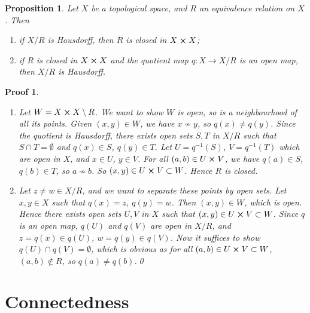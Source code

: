 \documentclass{article}
\theoremstyle{plain}\theoremheaderfont{\normalfont\itshape}\theorembodyfont{\rmfamily}\theoremseparator{.}\newtheorem*{rem}{Remark}\newtheorem*{ex}{Example}\newtheorem*{proof}{Proof}\newtheorem*{altp}{Alternative proof}
\theoremstyle{plain}\theoremheaderfont{\normalfont\bfseries}\theorembodyfont{\rmfamily}\theoremseparator{.}\newtheorem{thm}{Theorem}[section]\newtheorem{lem}[thm]{Lemma}\newtheorem{prop}[thm]{Proposition}\newtheorem*{cor}{Corollary}\newtheorem{defn}[thm]{Definition}\newtheorem{clm}[thm]{Claim}\newtheorem{clminproof}{Claim}
\theoremstyle{break}\theoremheaderfont{\normalfont\itshape}\theorembodyfont{\rmfamily}\theoremseparator{.\medskip}\newtheorem*{proofskip}{Proof}\newtheorem*{exs}{Examples}\newtheorem*{rems}{Remarks}
\theoremstyle{break}\theoremheaderfont{\normalfont\bfseries}\theorembodyfont{\rmfamily}\theoremseparator{.\medskip}\newtheorem{lemskip}[thm]{Lemma}\newtheorem{defnskip}[thm]{Definition}\newtheorem{propskip}[thm]{Proposition}\newtheorem{thmskip}[thm]{Theorem}
\newcommand{\qed}{\hfill\ensuremath{\Box}}
\begin{document}
    \begin{prop}
        Let \(X\) be a topological space, and \(R\) an equivalence relation on \(X\). Then
        \begin{enumerate}[label=(\roman*),topsep=0pt]
            \item if \(X/R\) is Hausdorff, then \(R\) is closed in \(X\cross X\);
            \item if \(R\) is closed in \(X\cross X\) and the quotient map \(q:X\to X/R\) is an open map, then \(X/R\) is Hausdorff.
        \end{enumerate}
    \end{prop}
    \begin{proofskip}
        \begin{enumerate}[label=(\roman*),topsep=0pt]
            \item Let \(W=X\cross X\setminus R\). We want to show \(W\) is open, so is a neighbourhood of all its points. Given \((x,y)\in W\), we have \(x\not\sim y\), so \(q(x)\ne q(y)\). Since the quotient is Hausdorff, there exists open sets \(S,T\) in \(X/R\) such that \(S\cap T=\emptyset\) and \(q(x)\in S\), \(q(y)\in T\). Let \(U=q^{-1}(S)\), \(V=q^{-1}(T)\) which are open in \(X\), and \(x\in U\), \(y\in V\). For all \((a,b)\in U\cross V\), we have \(q(a)\in S\), \(q(b)\in T\), so \(a\not\sim b\). So \((x,y)\in U\cross V\subset W\). Hence \(R\) is closed.
            \item Let \(z\ne w\in X/R\), and we want to separate these points by open sets. Let \(x,y\in X\) such that \(q(x)=z\), \(q(y)=w\). Then \((x,y)\in W\), which is open. Hence there exists open sets \(U,V\) in \(X\) such that \((x,y)\in U\cross V\subset W\). Since \(q\) is an open map, \(q(U)\) and \(q(V)\) are open in \(X/R\), and \(z=q(x)\in q(U)\), \(w=q(y)\in q(V)\). Now it suffices to show \(q(U)\cap q(V)=\emptyset\), which is obvious as for all \((a,b)\in U\cross V\subset W\), \((a,b)\not\in R\), so \(q(a)\ne q(b)\).\qed
        \end{enumerate}
    \end{proofskip}
    \newpage
    \section{Connectedness}
\end{document}
